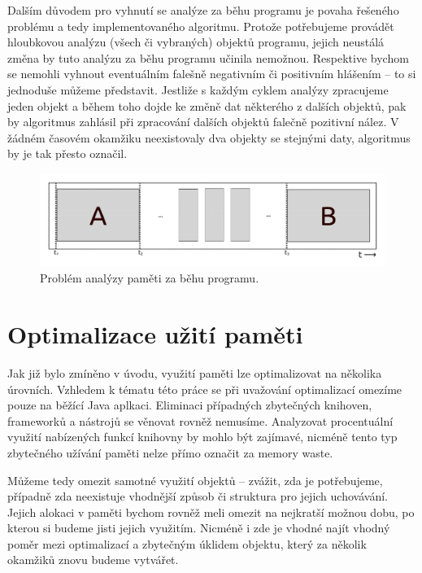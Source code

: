 Dalším důvodem pro vyhnutí se analýze za běhu programu je povaha řešeného problému a tedy implementovaného algoritmu. Protože potřebujeme provádět hloubkovou analýzu (všech či vybraných) objektů programu, jejich neustálá změna by tuto analýzu za běhu programu učinila nemožnou. Respektive bychom se nemohli vyhnout eventuálním falešně negativním či positivním hlášením -- to si jednoduše můžeme představit. Jestliže s každým cyklem analýzy zpracujeme jeden objekt a během toho dojde ke změně dat některého z dalších objektů, pak by algoritmus zahlásil při zpracování dalších objektů falečně pozitivní nález. V žádném časovém okamžiku neexistovaly dva objekty se stejnými daty, algoritmus by je tak přesto označil.


\begin{figure}[h]
	\centering
	\includegraphics[scale=0.5]{obrazky/runtime-analysis.png}
	\caption{Problém analýzy paměti za běhu programu.}
	\label{obrRuntimeAnalysis}
\end{figure}






\chapter{Optimalizace užití paměti}

Jak již bylo zmíněno v úvodu, využití paměti lze optimalizovat na několika úrovních. Vzhledem k tématu této práce se při uvažování optimalizací omezíme pouze na běžící Java aplkaci. Eliminaci případných zbytečných knihoven, frameworků a nástrojů se věnovat rovněž nemusíme. Analyzovat procentuální využití nabízených funkcí knihovny by mohlo být zajímavé, nicméně tento typ zbytečného užívání paměti nelze přímo označit za memory waste.

Můžeme tedy omezit samotné využití objektů -- zvážit, zda je potřebujeme, případně zda neexistuje vhodnější způsob či struktura pro jejich uchovávání. Jejich alokaci v paměti bychom rovněž meli omezit na nejkratší možnou dobu, po kterou si budeme jisti jejich využitím. Nicméně i zde je vhodné najít vhodný poměr mezi optimalizací a zbytečným úklidem objektu, který za několik okamžiků znovu budeme vytvářet.

